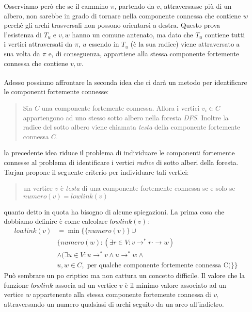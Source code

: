 Osserviamo per\`o che se il cammino $\pi$, partendo da $v$,
attraversasse pi\`u di un albero, non sarebbe in grado di tornare
nella componente connessa che contiene $w$ perch\`e gli archi
trasversali non possono orientarsi a destra. Questo prova l'esistenza
di $T_{u}$ e $v,w$ hanno un comune antenato, ma dato che $T_{u}$
contiene tutti i vertici attraversati da $\pi$, $u$ essendo in $T_{u}$
(\`e la sua radice) viene attraversato a sua volta da $\pi$ e, di
conseguenza, appartiene alla stessa componente fortemente connessa che
contiene $v, w$.
\\\\
Adesso possiamo affrontare la seconda idea che ci dar\`a un metodo per
identificare le componenti fortemente connesse:
\begin{quotation}
  Sia $C$ una componente fortemente connessa. Allora i vertici $v_{i}
  \in C$ appartengono ad uno stesso sotto albero nella foresta
  \emph{DFS}. Inoltre la radice del sotto albero viene chiamata
  \emph{testa} della componente fortemente connessa $C$.
\end{quotation}
la precedente idea riduce il problema di individuare le componenti
fortemente connesse al problema di identificare i vertici
\emph{radice} di sotto alberi della foresta. Tarjan propone il
seguente criterio per individuare tali vertici:
\begin{quotation}
  un vertice $v$ \`e \emph{testa} di una componente fortemente
  connessa se e solo se $numero(v) = lowlink(v)$
\end{quotation}
quanto detto in quota ha bisogno di alcune spiegazioni. La prima cosa
che dobbiamo definire \`e come calcolare $lowlink(v)$:
\begin{displaymath}
  \begin{split}
    lowlink(v) &= \min \{ \{numero(v)\} \cup \\
      & \{numero(w): (\exists r \in V: v \rightarrow^{*} r
      \cdot\rightarrow w) \\
      & \wedge (\exists u \in V: u \rightarrow^{*} v \wedge u
      \rightarrow^{*} w \wedge \\
      & u,w \in C, \text{ per qualche componente fortemente connessa
        C}) \}\}
  \end{split}
\end{displaymath}
Pu\`o sembrare un po criptico ma non cattura un concetto difficile. Il
valore che la funzione $lowlink$ associa ad un vertice $v$ \`e il
minimo valore associato ad un vertice $w$ appartenente alla stessa
componente fortemente connessa di $v$, attraversando un numero
qualsiasi di archi seguito da un arco all'indietro.


